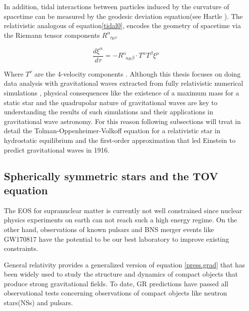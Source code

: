 In addition, tidal interactions between particles induced by the curvature of spacetime can be measured by the geodesic deviation equation(see Hartle \cite{Hartle:2021pel}). The relativistic analogous of equation\ref{tidal0}, encodes the geometry of spacetime via the Riemann tensor components $R^{\alpha}_{\;\; \tau \mu \tau}$

\begin{equation}\label{tidal1}
\frac{d \xi^{\alpha}}{d\tau} = - R^{\alpha}_{\;\; \alpha \mu \beta} \cdot T^{\alpha} T^{\beta} \xi^{\mu}
\end{equation} 

Where $T^{\nu}$ are the 4-velocity components . Although this thesis focuses on doing data analysis with gravitational waves extracted from fully relativistic numerical simulations \cite{Bishop:2016lgv}, physical consequences like the existence of a maximum mass for a static star and the quadrupolar nature of gravitational waves are key to understanding the results of such simulations and their applications in gravitational wave astronomy. For this reason following subsections will treat in detail the Tolman-Oppenheimer-Volkoff equation for a relativistic star in hydrostatic equilibrium and the first-order approximation that led Einstein to predict gravitational waves in 1916.





\subsection{Spherically symmetric stars and the TOV equation}\label{codeon}

The EOS for supranuclear matter is currently not well constrained since nuclear physics experiments on earth can not reach such a high energy regime. On the other hand, observations of known pulsars and BNS merger events like GW170817 have the potential to be our best laboratory to improve existing constraints.

General relativity provides a generalized version of equation  \ref{press.grad} that has been widely used to study the structure and dynamics of compact objects that produce strong gravitational fields. To date, GR predictions have passed all observational tests concerning observations of compact objects like neutron stars(NSs) and pulsars. 



